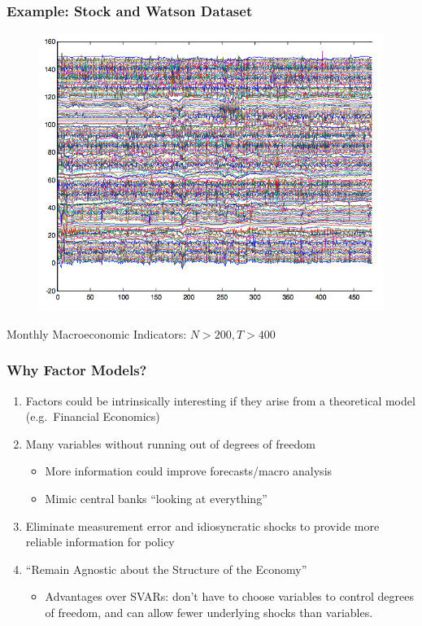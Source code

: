 \documentclass[handout]{beamer}
\begin{document}
\begin{frame}[c]\frametitle{Example: Stock and Watson Dataset}
    

	\begin{figure}
		\centering
		\includegraphics[scale = 0.3]{../img/stock_watson_dataset}
	\end{figure}
Monthly Macroeconomic Indicators: $N > 200, T >400$

\end{frame}

\begin{frame}[c]\frametitle{Why Factor Models?}
   
\begin{enumerate}
	\item Factors could be intrinsically interesting if they arise from a theoretical model (e.g.\ Financial Economics)
	\item Many variables without running out of degrees of freedom\begin{itemize}
			\item More information could improve forecasts/macro analysis
			\item Mimic central banks ``looking at everything'' 
		\end{itemize}
	\item Eliminate measurement error and idiosyncratic shocks to provide more reliable information for policy
	\item ``Remain Agnostic about the Structure of the Economy''\begin{itemize}
		\item Advantages over SVARs: don't have to choose variables to control degrees of freedom, and can allow fewer underlying shocks than variables. 
	\end{itemize}
\end{enumerate}


\end{frame}
\end{document}
